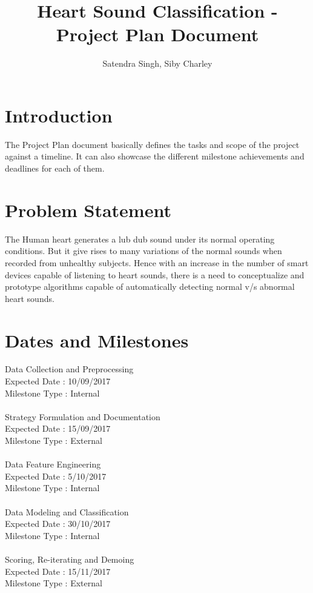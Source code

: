 \documentclass[12pt]{article}
\title{Heart Sound Classification - Project Plan Document}
\author{Satendra Singh, Siby Charley}
\begin{document}
\begin{titlepage}
\maketitle
\end{titlepage}

\section*{Introduction}
The Project Plan document basically defines the tasks and scope of the project against a timeline. It can also showcase the different milestone achievements and deadlines for each of them.

\section*{Problem Statement}
The Human heart generates a lub dub sound under its normal operating conditions. But it give rises to many variations of the normal sounds when recorded from unhealthy subjects. Hence with an increase in the number of smart devices capable of listening to heart sounds, there is a need to conceptualize and prototype algorithms capable of automatically detecting normal v/s abnormal heart sounds.   

\section*{Dates and Milestones}
Data Collection	and	Preprocessing\\
Expected Date	:	10/09/2017\\
Milestone Type	:	Internal\\
\\
Strategy Formulation and Documentation\\
Expected Date	:	15/09/2017\\
Milestone Type	:	External\\
\\  
Data Feature Engineering\\
Expected Date	:	5/10/2017\\
Milestone Type	:	Internal\\
\\
Data Modeling and Classification\\
Expected Date	:	30/10/2017\\
Milestone Type	:	Internal\\
\\
Scoring, Re-iterating and Demoing\\
Expected Date	:	15/11/2017\\
Milestone Type	:	External
\end{document}
